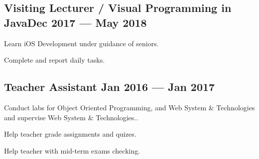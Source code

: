 \documentclass[letter,10pt]{article}
\begin{document}
\subsection{{Visiting Lecturer / Visual Programming in Java\hfill Dec 2017 --- May 2018}}
\begin{zitemize}
\item Learn iOS Development under guidance of seniors.
\item Complete and report daily tasks.
\end{zitemize}

\subsection{{Teacher Assistant \hfill Jan 2016 --- Jan 2017}}
\begin{zitemize}
\item Conduct labs for Object Oriented Programming, and Web System \& Technologies and supervise Web System \& Technologies..
\item Help teacher grade assignments and quizes.
\item Help teacher with mid-term exams checking.
\end{zitemize}
\end{document}
